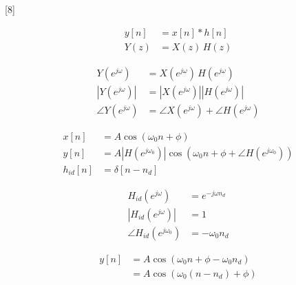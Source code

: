\documentclass[11pt,a4paper]{article}
\begin{document}
[8]

\begin{align*}
y[n] &= x[n] * h[n] \\
Y(z) &= X(z)\, H(z)
\end{align*}

\begin{align*}
Y(e^{j\omega}) &= X(e^{j\omega})\, H(e^{j\omega}) \\
\left|Y(e^{j\omega})\right| &= \left|X(e^{j\omega})\right| \left|H(e^{j\omega})\right| \\
\angle Y(e^{j\omega}) &= \angle X(e^{j\omega}) + \angle H(e^{j\omega})
\end{align*}

\begin{align*}
x[n] &= A\cos(\omega_0 n + \phi) \\
y[n] &= A\left|H(e^{j\omega_0})\right| \cos\left(\omega_0 n + \phi + \angle H(e^{j\omega_0})\right) \\
h_{id}[n] &= \delta[n - n_d]
\end{align*}

\begin{align*}
H_{id}(e^{j\omega}) &= e^{-j\omega n_d} \\[6pt]
\left|H_{id}(e^{j\omega})\right| &= 1 \\
\angle H_{id}(e^{j\omega_0}) &= -\omega_0 n_d
\end{align*}

\begin{align*}
y[n] &= A\cos(\omega_0 n + \phi - \omega_0 n_d) \\
&= A\cos\left(\omega_0 (n - n_d) + \phi\right)
\end{align*}
\end{document}
